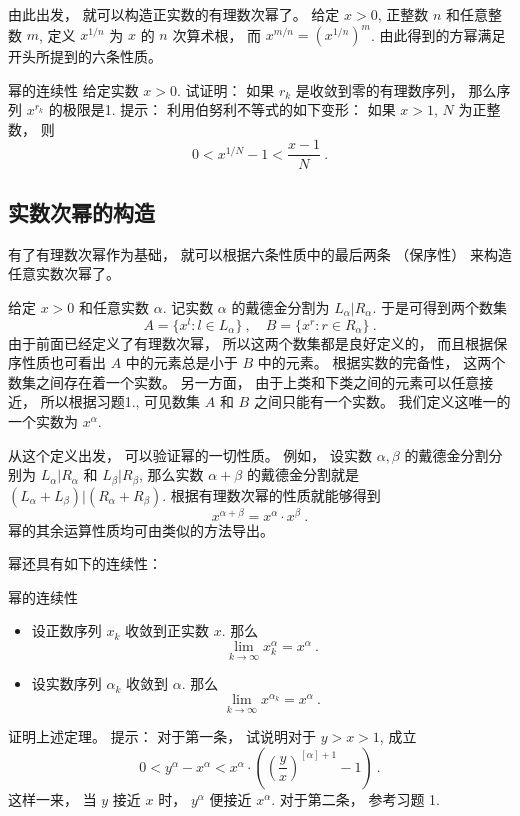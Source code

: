 由此出发， 就可以构造正实数的有理数次幂了。 给定 $x>0$, 正整数 $n$ 和任意整数 $m$, 定义 $x^{1/n}$ 为 $x$ 的 $n$ 次算术根， 而 $x^{m/n}=(x^{1/n})^m$. 由此得到的方幂满足开头所提到的六条性质。

\begin{exercise}{幂的连续性}
给定实数 $x>0$. 试证明： 如果 $r_k$ 是收敛到零的有理数序列， 那么序列 $x^{r_k}$ 的极限是1. 提示： 利用伯努利不等式的如下变形： 如果 $x>1$, $N$ 为正整数， 则
\[
0<x^{1/N}-1<\frac{x-1}{N}~.
\]
\end{exercise}

\subsection{实数次幂的构造}
有了有理数次幂作为基础， 就可以根据六条性质中的最后两条 （保序性） 来构造任意实数次幂了。 

给定 $x>0$ 和任意实数 $\alpha$. 记实数 $\alpha$ 的戴德金分割为 $L_\alpha|R_\alpha$. 于是可得到两个数集
\[
A=\{x^l:l\in L_\alpha\}~,\quad B=\{x^r:r\in R_\alpha\}~.
\]
由于前面已经定义了有理数次幂， 所以这两个数集都是良好定义的， 而且根据保序性质也可看出 $A$ 中的元素总是小于 $B$ 中的元素。 根据实数的完备性， 这两个数集之间存在着一个实数。 另一方面， 由于上类和下类之间的元素可以任意接近， 所以根据习题1., 可见数集 $A$ 和 $B$ 之间只能有一个实数。 我们定义这唯一的一个实数为 $x^\alpha$.

从这个定义出发， 可以验证幂的一切性质。 例如， 设实数 $\alpha,\beta$ 的戴德金分割分别为 $L_\alpha|R_\alpha$ 和 $L_\beta|R_\beta$, 那么实数 $\alpha+\beta$ 的戴德金分割就是 $(L_\alpha+L_\beta)|(R_\alpha+R_\beta)$. 根据有理数次幂的性质就能够得到
\[
x^{\alpha+\beta}=x^\alpha\cdot x^\beta~.
\]
幂的其余运算性质均可由类似的方法导出。

幂还具有如下的连续性：

\begin{theorem}{幂的连续性}
\begin{itemize}
\item 设正数序列 $x_k$ 收敛到正实数 $x$. 那么
\[
\lim_{k\to\infty}x_k^\alpha=x^\alpha~.
\]
\item 设实数序列 $\alpha_k$ 收敛到 $\alpha$. 那么
\[
\lim_{k\to\infty}x^{\alpha_k}=x^\alpha~.
\]
\end{itemize}
\end{theorem}

\begin{exercise}{}
证明上述定理。 提示： 对于第一条， 试说明对于 $y>x>1$, 成立
\[
0<y^\alpha-x^\alpha<x^\alpha\cdot\left(\left(\frac{y}{x}\right)^{[\alpha]+1}-1\right)~.
\]
这样一来， 当 $y$ 接近 $x$ 时， $y^\alpha$ 便接近 $x^\alpha$. 对于第二条， 参考习题 1.
\end{exercise}

